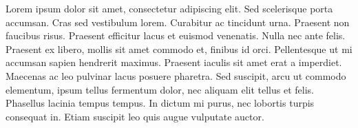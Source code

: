 \begin{agradecimentos}

Lorem ipsum dolor sit amet, consectetur adipiscing elit. Sed scelerisque porta accumsan. Cras sed vestibulum lorem. Curabitur ac tincidunt urna. Praesent non faucibus risus. Praesent efficitur lacus et euismod venenatis. Nulla nec ante felis. Praesent ex libero, mollis sit amet commodo et, finibus id orci. Pellentesque ut mi accumsan sapien hendrerit maximus. Praesent iaculis sit amet erat a imperdiet. Maecenas ac leo pulvinar lacus posuere pharetra. Sed suscipit, arcu ut commodo elementum, ipsum tellus fermentum dolor, nec aliquam elit tellus et felis. Phasellus lacinia tempus tempus. In dictum mi purus, nec lobortis turpis consequat in. Etiam suscipit leo quis augue vulputate auctor.

\end{agradecimentos}
